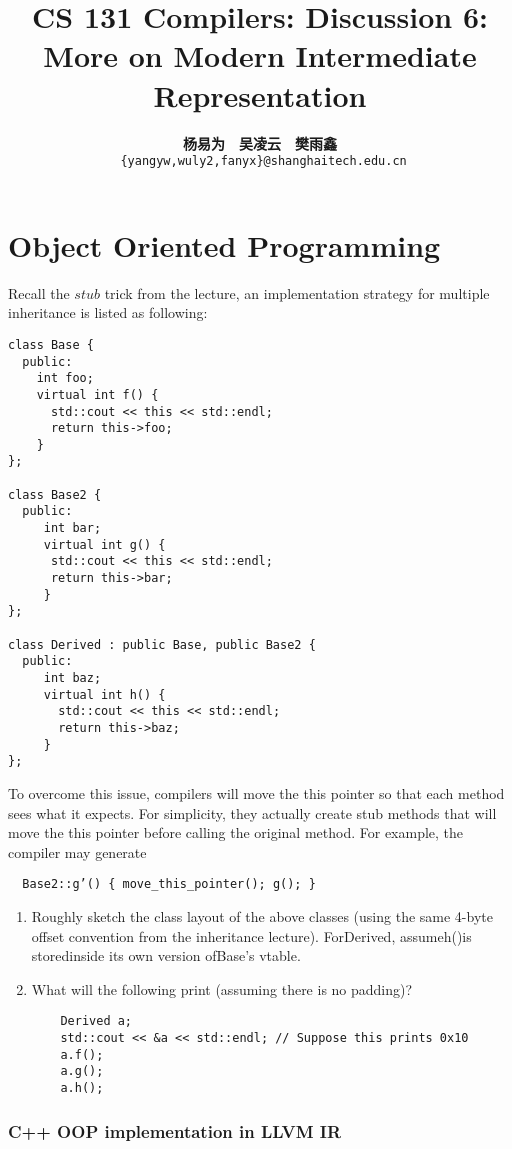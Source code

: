 \documentclass[a4paper]{exam}
\title{CS 131 Compilers: Discussion 6: More on Modern Intermediate Representation}
\author{\textbf{杨易为}~~\textbf{吴凌云}~~\textbf{樊雨鑫} \\ \texttt{ \{yangyw,wuly2,fanyx\}@shanghaitech.edu.cn}}
\theoremstyle{definition}
\begin{document}
\maketitle
\section{Object Oriented Programming}
Recall the $stub$ trick from the lecture, an implementation strategy for multiple inheritance is listed as following:

\begin{verbatim}
class Base {
  public:
    int foo;
    virtual int f() {
      std::cout << this << std::endl; 
      return this->foo;
    }
};

class Base2 {
  public:
     int bar;
     virtual int g() {
      std::cout << this << std::endl; 
      return this->bar;
     }
};

class Derived : public Base, public Base2 {
  public:
     int baz;
     virtual int h() {
       std::cout << this << std::endl; 
       return this->baz;
     }
};
\end{verbatim}

To overcome this issue, compilers will move the this pointer so that each method sees what it expects. For simplicity, they actually create stub methods that will move the this pointer before calling the original method. For example, the compiler may generate

\begin{verbatim}
  Base2::g’() { move_this_pointer(); g(); }
\end{verbatim}

\begin{enumerate}
  \item Roughly sketch the class layout of the above classes (using the same 4-byte offset convention  from  the  inheritance  lecture).   ForDerived,  assumeh()is  storedinside its own version ofBase’s vtable.
  \item What will the following print (assuming there is no padding)?
        \begin{verbatim}
    Derived a;
    std::cout << &a << std::endl; // Suppose this prints 0x10
    a.f();
    a.g();
    a.h();
  \end{verbatim}
\end{enumerate}
\subsubsection{C++ OOP implementation in LLVM IR}
\end{document}
